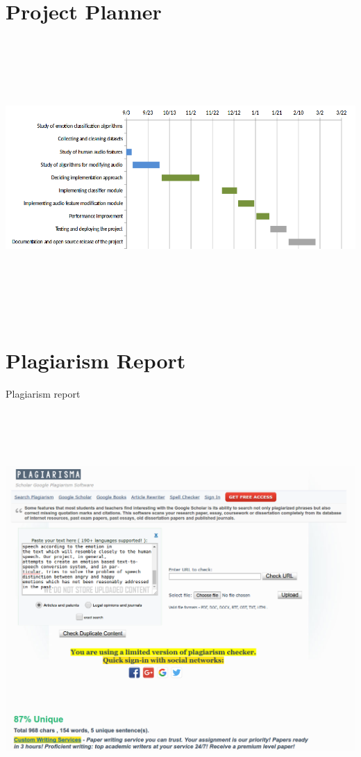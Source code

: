 \documentclass[oneside,a4paper,12pt]{book}
\begin{document}
\begin{appendices}
\chapter{Project Planner}
\label{app:plan}
\includegraphics[height=300pt,width=480pt]{gantt_chart.png}



\chapter{Plagiarism Report}
Plagiarism report \\
\includegraphics[width=400pt,height=450pt]{plagiarism.png}


\end{appendices}
\end{document}
